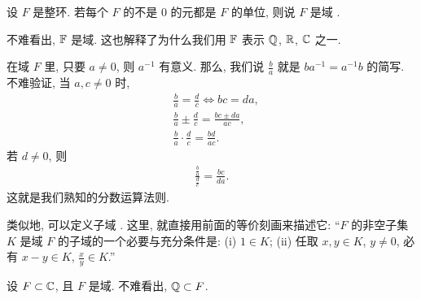 \begin{definition}
    设 $F$ 是整环. 若每个 $F$ 的不是 $0$ 的元都是 $F$ 的单位, 则说 $F$ 是域 .
\end{definition}

\begin{example}
    不难看出, $\mathbb{F}$ 是域. 这也解释了为什么我们用 $\mathbb{F}$ 表示 $\mathbb{Q}$, $\mathbb{R}$, $\mathbb{C}$ 之一.
\end{example}

\begin{remark}
    在域 $F$ 里, 只要 $a \neq 0$, 则 $a^{-1}$ 有意义. 那么, 我们说 $\frac{b}{a}$ 就是 $ba^{-1} = a^{-1}b$ 的简写. 不难验证, 当 $a,c \neq 0$ 时,
    \begin{align*}
         & \frac{b}{a} = \frac{d}{c} \iff bc = da,             \\
         & \frac{b}{a} \pm \frac{d}{c} = \frac{bc \pm da}{ac}, \\
         & \frac{b}{a} \cdot \frac{d}{c} = \frac{bd}{ac}.
    \end{align*}
    若 $d \neq 0$, 则
    \begin{align*}
        \frac{\frac{b}{a}}{\frac{d}{c}} = \frac{bc}{da}.
    \end{align*}
    这就是我们熟知的分数运算法则.
\end{remark}

\begin{remark}
    类似地, 可以定义子域 . 这里, 就直接用前面的等价刻画来描述它: ``$F$ 的非空子集 $K$ 是域 $F$ 的子域的一个必要与充分条件是: (i) $1 \in K$; (ii) 任取 $x,y \in K$, $y \neq 0$, 必有 $x-y \in K$, $\frac{x}{y} \in K$.''
\end{remark}

\begin{example}
    设 $F \subset \mathbb{C}$, 且 $F$ 是域. 不难看出, $\mathbb{Q} \subset F$.
\end{example}

